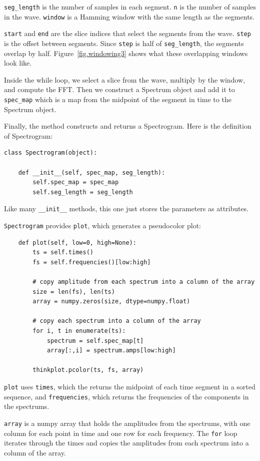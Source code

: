 \documentclass[12pt]{book}
\begin{document}
\verb"seg_length" is the number of samples in each segment.
{\tt n} is the number of samples in the wave.  {\tt window}
is a Hamming window with the same length as the segments.

{\tt start} and {\tt end} are the slice indices that select
the segments from the wave.  {\tt step} is the offset between
segments.  Since {\tt step} is half of \verb"seg_length", the
segments overlap by half.  Figure~\ref{fig.windowing3} shows what
these overlapping windows look like.

Inside the while loop, we select a slice from the wave, multiply
by the window, and compute the FFT.  Then we construct a Spectrum
object and add it to \verb"spec_map" which is a map from the
midpoint of the segment in time to the Spectrum object.

Finally, the method constructs and returns a Spectrogram.  Here
is the definition of Spectrogram:

\begin{verbatim}
class Spectrogram(object):

    def __init__(self, spec_map, seg_length):
        self.spec_map = spec_map
        self.seg_length = seg_length
\end{verbatim}

Like many \verb"__init__" methods, this one just stores the
parameters as attributes.

{\tt Spectrogram} provides {\tt plot}, which generates a
pseudocolor plot:

\begin{verbatim}
    def plot(self, low=0, high=None):
        ts = self.times()
        fs = self.frequencies()[low:high]

        # copy amplitude from each spectrum into a column of the array
        size = len(fs), len(ts)
        array = numpy.zeros(size, dtype=numpy.float)

        # copy each spectrum into a column of the array
        for i, t in enumerate(ts):
            spectrum = self.spec_map[t]
            array[:,i] = spectrum.amps[low:high]

        thinkplot.pcolor(ts, fs, array)
\end{verbatim}

{\tt plot} uses {\tt times}, which the returns the midpoint of each
time segment in a sorted sequence, and {\tt frequencies}, which returns
the frequencies of the components in the spectrums.

{\tt array} is a numpy array that holds the amplitudes from the
spectrums, with one column for each point in time and one row
for each frequency.  The {\tt for} loop iterates through the times
and copies the amplitudes from each spectrum into a column of the array.
\end{document}
